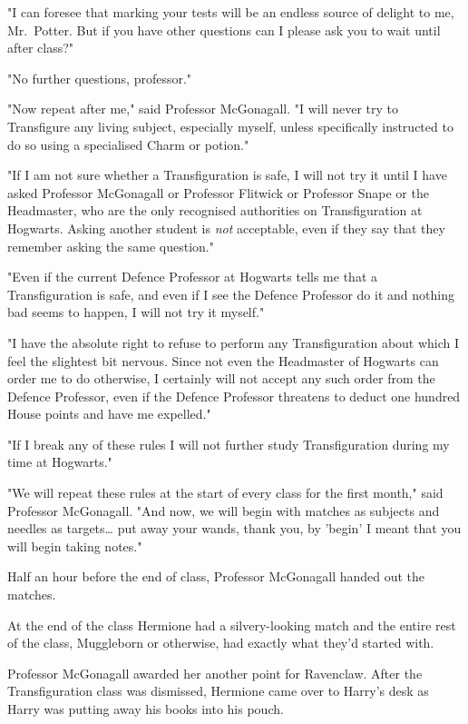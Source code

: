 "I can foresee that marking your tests will be an endless source of delight to 
me, Mr.~Potter. But if you have other questions can I please ask you to wait 
until after class?"

"No further questions, professor."

"Now repeat after me," said Professor McGonagall. "I will never try to 
Transfigure any living subject, especially myself, unless specifically 
instructed to do so using a specialised Charm or potion."

"If I am not sure whether a Transfiguration is safe, I will not try it until I 
have asked Professor McGonagall or Professor Flitwick or Professor Snape or the 
Headmaster, who are the only recognised authorities on Transfiguration at 
Hogwarts. Asking another student is \emph{not} acceptable, even if they say 
that they remember asking the same question."

"Even if the current Defence Professor at Hogwarts tells me that a 
Transfiguration is safe, and even if I see the Defence Professor do it and 
nothing bad seems to happen, I will not try it myself."

"I have the absolute right to refuse to perform any Transfiguration about which 
I feel the slightest bit nervous. Since not even the Headmaster of Hogwarts can 
order me to do otherwise, I certainly will not accept any such order from the 
Defence Professor, even if the Defence Professor threatens to deduct one 
hundred House points and have me expelled."

"If I break any of these rules I will not further study Transfiguration during 
my time at Hogwarts."

"We will repeat these rules at the start of every class for the first month," 
said Professor McGonagall. "And now, we will begin with matches as subjects and 
needles as targets{\ldots} put away your wands, thank you, by 'begin' I meant 
that you will begin taking notes."

Half an hour before the end of class, Professor McGonagall handed out the 
matches.

At the end of the class Hermione had a silvery-looking match and the entire 
rest of the class, Muggleborn or otherwise, had exactly what they'd started 
with.

Professor McGonagall awarded her another point for Ravenclaw.
\sbreak
After the Transfiguration class was dismissed, Hermione came over to Harry's 
desk as Harry was putting away his books into his pouch.

